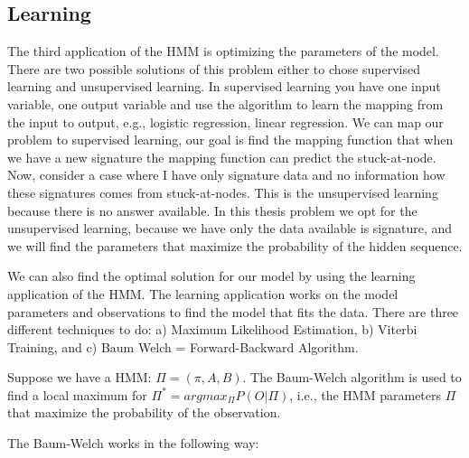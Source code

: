 \subsection{Learning}

The third application of the HMM is optimizing the parameters of the model. There are two possible solutions of this problem either to chose supervised learning and unsupervised learning.  In supervised learning you have one input variable, one output variable and use the algorithm to learn the mapping from the input to output, e.g., logistic regression, linear regression. We can map our problem to supervised learning, our goal is find the mapping function that when we have a new signature the mapping function can predict the stuck-at-node. Now, consider a case where I have only signature data and no information how these signatures comes from stuck-at-nodes.  This is the unsupervised learning because there is no answer available. In this thesis problem we opt for the unsupervised learning, because we have only the data available is signature, and we will find the parameters that maximize the probability of the hidden sequence.  

We can also find the optimal solution for our model by using the learning application of the HMM. The learning application works on the model parameters and observations to find the model that fits the data. There are three different techniques to do: a) Maximum Likelihood Estimation, b) Viterbi Training, and c) Baum  Welch = Forward-Backward Algorithm. 


Suppose we have a HMM: $\Pi = (\pi, A, B)$. The Baum-Welch algorithm is used to find  a local maximum for $\Pi^* = arg max_{\Pi} P (O | \Pi)$, i.e., the HMM parameters $\Pi$ that maximize the probability of the observation.

The Baum-Welch works in the following way:

